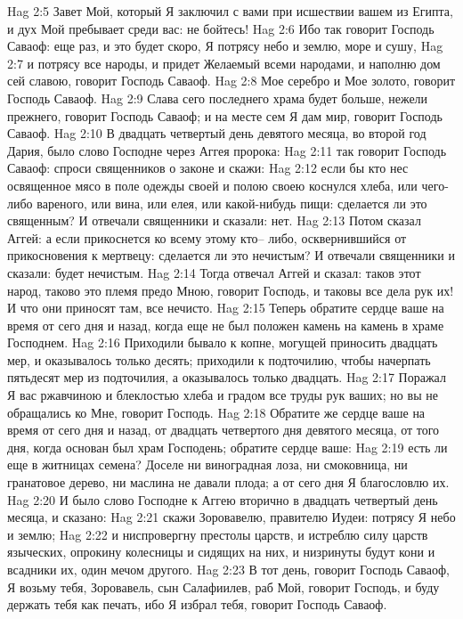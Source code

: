 Hag 2:5  Завет Мой, который Я заключил с вами при исшествии вашем из Египта, и дух Мой пребывает среди вас: не бойтесь!
Hag 2:6  Ибо так говорит Господь Саваоф: еще раз, и это будет скоро, Я потрясу небо и землю, море и сушу,
Hag 2:7  и потрясу все народы, и придет Желаемый всеми народами, и наполню дом сей славою, говорит Господь Саваоф.
Hag 2:8  Мое серебро и Мое золото, говорит Господь Саваоф.
Hag 2:9  Слава сего последнего храма будет больше, нежели прежнего, говорит Господь Саваоф; и на месте сем Я дам мир, говорит Господь Саваоф.
Hag 2:10  В двадцать четвертый день девятого месяца, во второй год Дария, было слово Господне через Аггея пророка:
Hag 2:11  так говорит Господь Саваоф: спроси священников о законе и скажи:
Hag 2:12  если бы кто нес освященное мясо в поле одежды своей и полою своею коснулся хлеба, или чего-либо вареного, или вина, или елея, или какой-нибудь пищи: сделается ли это священным? И отвечали священники и сказали: нет.
Hag 2:13  Потом сказал Аггей: а если прикоснется ко всему этому кто-- либо, осквернившийся от прикосновения к мертвецу: сделается ли это нечистым? И отвечали священники и сказали: будет нечистым.
Hag 2:14  Тогда отвечал Аггей и сказал: таков этот народ, таково это племя предо Мною, говорит Господь, и таковы все дела рук их! И что они приносят там, все нечисто.
Hag 2:15  Теперь обратите сердце ваше на время от сего дня и назад, когда еще не был положен камень на камень в храме Господнем.
Hag 2:16  Приходили бывало к копне, могущей приносить двадцать мер, и оказывалось только десять; приходили к подточилию, чтобы начерпать пятьдесят мер из подточилия, а оказывалось только двадцать.
Hag 2:17  Поражал Я вас ржавчиною и блеклостью хлеба и градом все труды рук ваших; но вы не обращались ко Мне, говорит Господь.
Hag 2:18  Обратите же сердце ваше на время от сего дня и назад, от двадцать четвертого дня девятого месяца, от того дня, когда основан был храм Господень; обратите сердце ваше:
Hag 2:19  есть ли еще в житницах семена? Доселе ни виноградная лоза, ни смоковница, ни гранатовое дерево, ни маслина не давали плода; а от сего дня Я благословлю их.
Hag 2:20  И было слово Господне к Аггею вторично в двадцать четвертый день месяца, и сказано:
Hag 2:21  скажи Зоровавелю, правителю Иудеи: потрясу Я небо и землю;
Hag 2:22  и ниспровергну престолы царств, и истреблю силу царств языческих, опрокину колесницы и сидящих на них, и низринуты будут кони и всадники их, один мечом другого.
Hag 2:23  В тот день, говорит Господь Саваоф, Я возьму тебя, Зоровавель, сын Салафиилев, раб Мой, говорит Господь, и буду держать тебя как печать, ибо Я избрал тебя, говорит Господь Саваоф.


